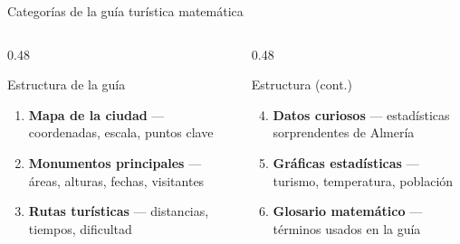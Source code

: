 \documentclass[aspectratio=169, 10pt, spanish]{beamer}
\begin{document}
\begin{frame}{Categorías de la guía turística matemática}
  \begin{columns}[t]
    \begin{column}{0.48\textwidth}
      \begin{definicionbox}{Estructura de la guía}
        \begin{enumerate}
          \item \textbf{Mapa de la ciudad} — coordenadas, escala, puntos clave
          \item \textbf{Monumentos principales} — áreas, alturas, fechas, visitantes
          \item \textbf{Rutas turísticas} — distancias, tiempos, dificultad
        \end{enumerate}
      \end{definicionbox}
    \end{column}
    \begin{column}{0.48\textwidth}
      \begin{definicionbox}{Estructura (cont.)}
        \begin{enumerate}\setcounter{enumi}{3}
          \item \textbf{Datos curiosos} — estadísticas sorprendentes de Almería
          \item \textbf{Gráficas estadísticas} — turismo, temperatura, población
          \item \textbf{Glosario matemático} — términos usados en la guía
        \end{enumerate}
      \end{definicionbox}
    \end{column}
  \end{columns}
  \vspace{0.35cm}
  \begin{center}
  \end{center}
\end{frame}
\end{document}
